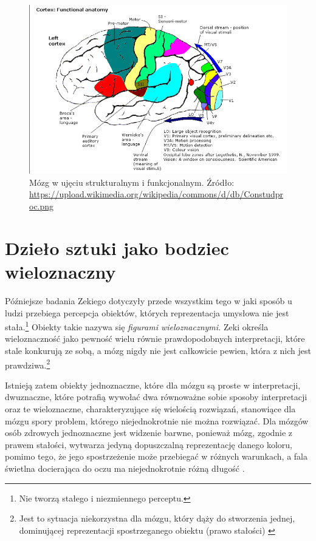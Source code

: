\documentclass[licencjacka]{kdypl}
\begin{document}
\begin{figure}[H]
\includegraphics{brain2.png}
\caption{Mózg w ujęciu strukturalnym i funkcjonalnym. Źródło: \url{https://upload.wikimedia.org/wikipedia/commons/d/db/Constudproc.png}}
\centering
\end{figure}




\section{Dzieło sztuki jako bodziec wieloznaczny}

Późniejsze badania Zekiego dotyczyły przede wszystkim tego w jaki sposób u ludzi przebiega percepcja obiektów, których reprezentacja umysłowa nie jest stała.\footnote{Nie tworzą stałego i niezmiennego perceptu.} Obiekty takie nazywa się \textit{figurami wieloznacznymi.} Zeki określa wieloznaczność jako pewność wielu równie prawdopodobnych interpretacji, które stale konkurują ze sobą, a mózg nigdy nie jest całkowicie pewien, która z nich jest prawdziwa.\footnote{Jest to sytuacja niekorzystna dla mózgu, który dąży do stworzenia jednej, dominującej reprezentacji spostrzeganego obiektu (prawo stałości) \citep[s. 424-425]{Wieloznacznosc}}

Istnieją zatem obiekty jednoznaczne, które dla mózgu są proste w interpretacji, dwuznaczne, które potrafią wywołać dwa równoważne sobie sposoby interpretacji oraz te wieloznaczne, charakteryzujące się wielością rozwiązań, stanowiące dla mózgu spory problem, którego niejednokrotnie nie można rozwiązać. Dla mózgów osób zdrowych jednoznaczne jest widzenie barwne, ponieważ mózg, zgodnie z prawem stałości, wytwarza jedyną dopuszczalną reprezentację danego koloru, pomimo tego, że jego spostrzeżenie może przebiegać w różnych warunkach, a fala świetlna docierająca do oczu ma niejednokrotnie różną długość \citep[s. 85-86]{Zeki}.
\end{document}
